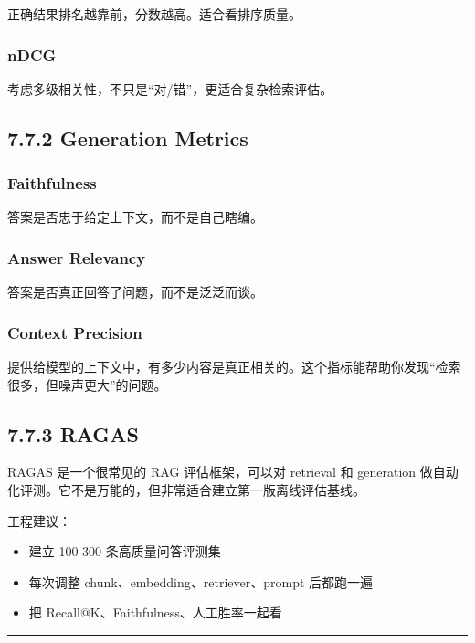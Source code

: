 正确结果排名越靠前，分数越高。适合看排序质量。


\subsubsection{nDCG}

考虑多级相关性，不只是``对/错''，更适合复杂检索评估。


\subsection{7.7.2 Generation Metrics}

\subsubsection{Faithfulness}

答案是否忠于给定上下文，而不是自己瞎编。


\subsubsection{Answer Relevancy}

答案是否真正回答了问题，而不是泛泛而谈。


\subsubsection{Context Precision}

提供给模型的上下文中，有多少内容是真正相关的。这个指标能帮助你发现``检索很多，但噪声更大''的问题。


\subsection{7.7.3 RAGAS}

RAGAS 是一个很常见的 RAG 评估框架，可以对 retrieval 和 generation 做自动化评测。它不是万能的，但非常适合建立第一版离线评估基线。


工程建议：


\begin{itemize}[leftmargin=2em]
\item 建立 100-300 条高质量问答评测集
\item 每次调整 chunk、embedding、retriever、prompt 后都跑一遍
\item 把 Recall@K、Faithfulness、人工胜率一起看
\end{itemize}

\bigskip\hrule\bigskip

